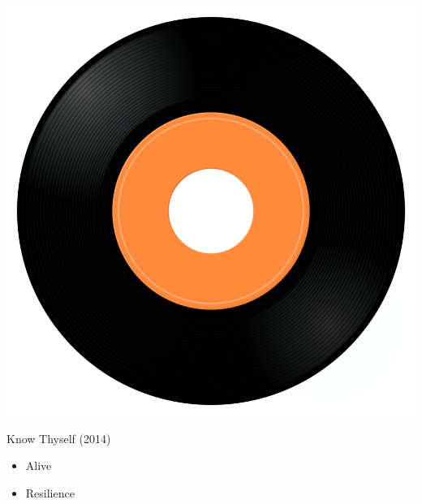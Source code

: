 \begin{minipage}[t]{0.25\textwidth}\vspace{0pt}
\captionsetup{type=figure}
\includegraphics[width=\textwidth]{Images/cover.png}
\caption*{Know Thyself (2014)}
\end{minipage}
\begin{minipage}[t]{0.25\textwidth}\vspace{0pt}
\begin{itemize}[nosep,leftmargin=1em,labelwidth=*,align=left]
	\setlength{\itemsep}{0pt}
	\item Alive
	\item Resilience
\end{itemize}
\end{minipage}
